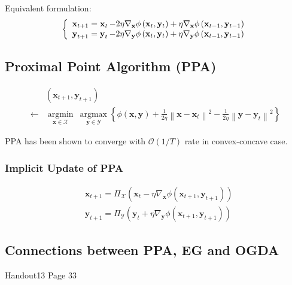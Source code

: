 Equivalent formulation:
$$
\left\{\begin{array}{l}
\operatorname{\boldsymbol{\mathbf{x}}}_{t+1}=\operatorname{\boldsymbol{\mathbf{x}}}_{t}-2 \eta \nabla_{\mathbf{x}} \phi\left(\mathbf{x}_{t}, \mathbf{y}_{t}\right)+\eta \nabla_{\mathbf{x}} \phi\left(\mathbf{x}_{t-1}, \mathbf{y}_{t-1}\right) \\
\operatorname{\boldsymbol{\mathbf{y}}}_{t+1}=\operatorname{\boldsymbol{\mathbf{y}}}_{t}-2 \eta \nabla_{\mathbf{y}} \phi\left(\mathbf{x}_{t}, \mathbf{y}_{t}\right)+\eta \nabla_{\mathbf{y}} \phi\left(\mathbf{x}_{t-1}, \mathbf{y}_{t-1}\right)
\end{array}\right.
$$





\subsection*{Proximal Point Algorithm (PPA)}
$$
\begin{aligned}
&\left(\mathbf{x}_{t+1}, \mathbf{y}_{t+1}\right) \\
\leftarrow& \underset{\mathbf{x} \in \mathcal{X}}{\operatorname{argmin}} \  \underset{\mathbf{y} \in \mathcal{Y}}  {\operatorname{argmax}}\left\{\phi(\mathbf{x}, \mathbf{y})+\frac{1}{2 \eta}\left\|\mathbf{x}-\mathbf{x}_{t}\right\|^{2}-\frac{1}{2 \eta}\left\|\mathbf{y}-\mathbf{y}_{t}\right\|^{2}\right\}
\end{aligned}
$$

PPA has been shown to converge with $\mathcal{O}(1 / T)$ rate in convex-concave case.

\subsubsection*{Implicit Update of PPA}
$$
\begin{aligned}
&\mathbf{x}_{t+1}=\Pi_{\mathcal{X}}\left(\mathbf{x}_{t}-\eta \nabla_{\mathbf{x}} \phi\left(\mathbf{x}_{t+1}, \mathbf{y}_{t+1}\right)\right) \\
&\mathbf{y}_{t+1}=\Pi_{\mathcal{Y}}\left(\mathbf{y}_{t}+\eta \nabla_{\mathbf{y}} \phi\left(\mathbf{x}_{t+1}, \mathbf{y}_{t+1}\right)\right)
\end{aligned}
$$




\subsection*{Connections between PPA, EG and OGDA}
Handout13 Page 33






